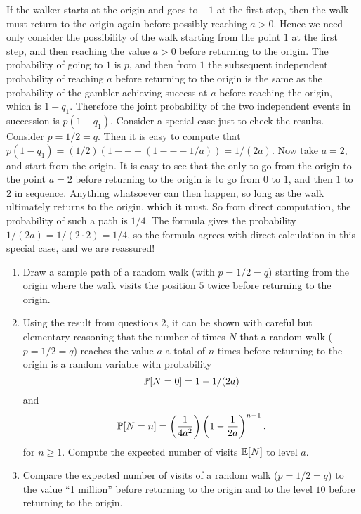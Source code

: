 \begin{solution}
\begin{solution}
\begin{solution}
\begin{solution}
\begin{solution}
\begin{solution}
\begin{solution}
\begin{solution}
{\begin{solution}
If the walker starts at the origin and
goes to $-1$ at the first step, then the walk must return to
the origin again before possibly reaching $a>0$.  Hence we
need only consider the possibility of the walk starting from
the point $1$ at the first step, and then reaching the value
$a>0$ before returning to the origin.  The probability of
going to $1$ is $p$, and then from $1$ the subsequent
independent probability of reaching $a$ before returning to
the origin is the same as the probability of the gambler
achieving success at $a$ before reaching the origin, which is
$1-q_{1}$.  Therefore the joint probability of the two
independent events
in succession is $p(1-q_{1})$.
Consider a special case just to check the results.  Consider $p =  1/2 = q$.  
Then it is easy to compute that $p(1-q_1) = (1/2)(1 --- (1 --- 1/a)) = 1/(2a)$.  
Now take $a = 2$, and start from the origin.  It is easy to see that the only to go from
the origin to the point $a=2$ before returning to the origin is
to go from $0$ to $1$, and then $1$ to $2$ in sequence.
Anything whatsoever can then happen, so long as the walk
ultimately returns to the origin, which it must.  So from direct
computation, the probability of such a path is $1/4$.  The
formula gives the probability $1/(2a) = 1/(2 \cdot 2) = 1/4$, so the
formula agrees with direct calculation in this special case,
and we are reassured!  
\end{solution}

\begin{problem}
  \begin{enumerate}
    \item Draw a sample path of a random walk (with $p = 1/2 = q$) 
      starting from the
      origin where the walk visits the position $5$ twice before
      returning to the origin.
    \item Using the result from questions 2, it can be shown
      with careful but elementary reasoning that the number of times
      $N$ that a random
      walk ($p = 1/2 = q$) reaches the value $a$ a total of
      $n$ times before
      returning to the origin is a random variable with
      probability
      \[
           \P[N=0] = 1 - 1/(2a)
      \]
      and
      \[
          \P[N=n] = \left( \frac{1}{4a^2} \right) \left( 1 -
          \frac{1}{2a} \right)^{n-1}.
      \]  
      for $n \ge 1$.
      Compute the
      expected number of visits $\E[N]$ to level $a$.
    \item Compare the expected number of visits of a random walk
      ($p= 1/2 = q$) to the value ``1 million'' before returning to
      the origin and to the level $10$ before returning to the origin.
  \end{enumerate}
\end{problem} 
\begin{solution} 


\end{solution}}
\end{solution}
\end{solution}
\end{solution}
\end{solution}
\end{solution}
\end{solution}
\end{solution}
\end{solution}
